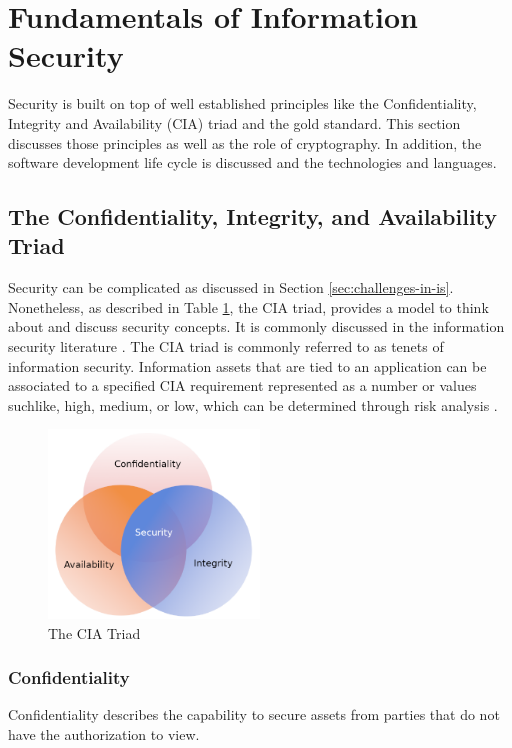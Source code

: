 \section{Fundamentals of Information Security}\label{sec:fundamentals-of-infosec}
Security is built on top of well established principles like the Confidentiality, Integrity and Availability (CIA) triad and the gold standard. This section discusses those principles as well as the role of cryptography. In addition, the software development life cycle is discussed and the technologies and languages.

\subsection{The Confidentiality, Integrity, and Availability Triad}\label{subsec:cia}
Security can be complicated as discussed in Section \ref{sec:challenges-in-is}. Nonetheless, as described in Table \ref{fig:cia}, the CIA triad, provides a model to think about and discuss security concepts. It is commonly discussed in the information security literature \cite{andress2014the} \cite{srinivasan2016cissp} \cite{death2017information}. The CIA triad is commonly referred to as tenets of information security. Information assets that are tied to an application can be associated to a specified CIA requirement represented as a number or values suchlike, high, medium, or low, which can be determined through risk analysis \cite{srinivasan2016cissp}. 

\begin{figure}[!h]
    \centering
    \includegraphics[width=0.5\textwidth]{../../img/chapter_2/cia-triad.png}
    \caption{The CIA Triad}\label{fig:cia}
\end{figure}

\subsubsection{Confidentiality}
Confidentiality describes the capability to secure assets from parties that do not have the authorization to view. 
